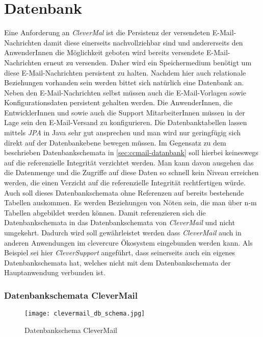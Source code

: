 \chapter{Datenbank}
Eine Anforderung an \emph{CleverMal} ist die Persistenz der versendeten E-Mail-Nachrichten damit diese einerseits nachvollziehbar sind und andererseits den AnwenderInnen die Möglichkeit geboten wird bereits versendete E-Mail-Nachrichten erneut zu versenden. Daher wird ein Speichermedium benötigt um diese E-Mail-Nachrichten persistent zu halten. Nachdem hier auch relationale Beziehungen vorhanden sein werden bittet sich natürlich eine Datenbank an. Neben den E-Mail-Nachrichten selbst müssen auch die E-Mail-Vorlagen sowie Konfigurationsdaten persistent gehalten werden. Die AnwenderInnen, die EntwicklerInnen und sowie auch die Support MitarbeiterInnen müssen in der Lage sein den E-Mail-Versand zu konfigurieren.
\newline
\newline
Die Datenbanktabellen lassen mittels \emph{JPA} in Java sehr gut ansprechen und man wird nur geringfügig sich direkt auf der Datenbankebene bewegen müssen. Im Gegensatz zu dem beschrieben Datenbankschemata in \ref{sec:ccmail-datanbank} soll hierbei keineswegs auf die referenzielle Integrität verzichtet werden. Man kann davon ausgehen das die Datenmenge und die Zugriffe auf diese Daten so schnell kein Niveau erreichen werden, die einen Verzicht auf die referenzielle Integrität rechtfertigen würde. Auch soll dieses Datenbankschemata ohne Referenzen auf bereits bestehende Tabellen auskommen. Es werden Beziehungen von Nöten sein, die man über n-m Tabellen abgebildet werden können. Damit referenzieren sich die Datenbankschemata in das Datenbankschemata von \emph{CleverMail} und nicht umgekehrt. Dadurch wird soll gewährleistet werden dass \emph{CleverMail} auch in anderen Anwendungen im clevercure Ökosystem eingebunden werden kann. Als Beispiel sei hier \emph{CleverSupport} angeführt, dass seinerseits auch ein eigenes Datenbankschemata hat, welches nicht mit dem Datenbankschemata der Hauptanwendung verbunden ist.
\newpage
\subsection{Datenbankschemata CleverMail}
\begin{figure}[h]
\centering
\texttt{[image: clevermail\_db\_schema.jpg]}
\caption{Datenbankschema CleverMail}
\label{fig:clevermail-db-schema}
\end{figure}